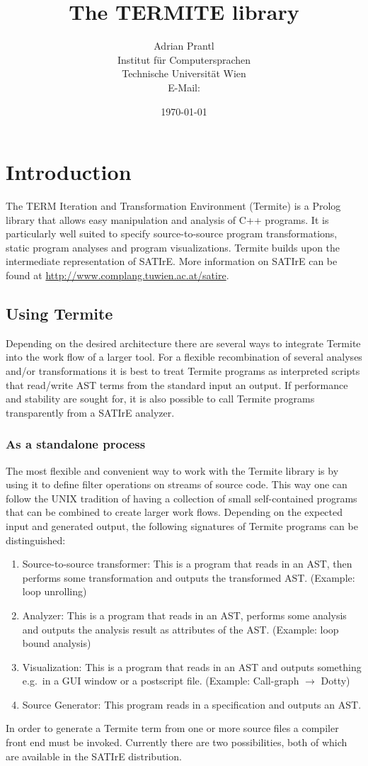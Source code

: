 \documentclass[10pt,twoside]{scrreprt}
\title{The TERMITE library}
\author{Adrian Prantl\\
  Institut f\"{u}r Computersprachen\\
  Technische Universit\"{a}t Wien\\
  E-Mail: \email{adrian@complang.tuwien.ac.at}
}
\date{\today}
\begin{document}
\maketitle

\tableofcontents

\chapter{Introduction}

The TERM Iteration and Transformation Environment (Termite) is a
Prolog library that allows easy manipulation and analysis of C++
programs. It is particularly well suited to specify source-to-source
program transformations, static program analyses and program
visualizations. Termite builds upon the intermediate representation of
SATIrE. More information on SATIrE can be found at
\url{http://www.complang.tuwien.ac.at/satire}.

\section{Using Termite}

Depending on the desired architecture there are several ways to
integrate Termite into the work flow of a larger tool. For a flexible
recombination of several analyses and/or transformations it is best to
treat Termite programs as interpreted scripts that read/write AST
terms from the standard input an output. If performance and stability
are sought for, it is also possible to call Termite programs
transparently from a SATIrE analyzer.

\subsection{As a standalone process}
The most flexible and convenient way to work with the Termite library
is by using it to define filter operations on streams of source
code. This way one can follow the UNIX tradition of having a
collection of small self-contained programs that can be combined to
create larger work flows. Depending on the expected input and
generated output, the following signatures of Termite programs can be
distinguished:
\begin{enumerate}
\item Source-to-source transformer: This is a program that reads in an
  AST, then performs some transformation and outputs the transformed
  AST. (Example: loop unrolling)
\item Analyzer: This is a program that reads in an AST, performs some
  analysis and outputs the analysis result as attributes of the
  AST. (Example: loop bound analysis)
\item Visualization: This is a program that reads in an AST and
  outputs something e.g.~in a GUI window or a postscript
  file. (Example: Call-graph $\rightarrow$ Dotty)
\item Source Generator: This program reads in a specification and
  outputs an AST.
\end{enumerate}
In order to generate a Termite term from one or more source files a
compiler front end must be invoked. Currently there are two
possibilities, both of which are available in the SATIrE distribution.
\end{document}
